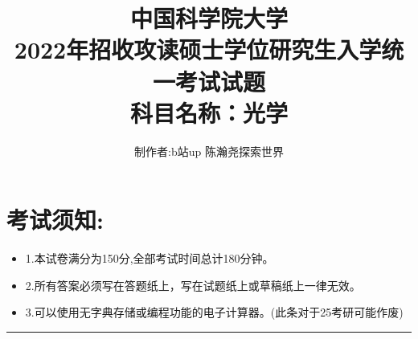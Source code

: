 \documentclass[11pt,a4paper]{article}
\begin{document}
    \title{中国科学院大学\\2022年招收攻读硕士学位研究生入学统一考试试题\\科目名称：光学}
    \author{制作者:b站up 陈瀚尧探索世界}
    \date{}
    \maketitle
    \titleformat{\section}[block]{\normalfont\Large\bfseries}{}{0pt}{}


    \section{考试须知:}
    \begin{itemize}[topsep=0pt,itemsep=0pt,partopsep=0pt]
        \item 1.本试卷满分为150分,全部考试时间总计180分钟。
        \vspace{-3mm}
        \item 2.所有答案必须写在答题纸上，写在试题纸上或草稿纸上一律无效。
        \vspace{-3mm}
        \item 3.可以使用无字典存储或编程功能的电子计算器。(此条对于25考研可能作废)
    \end{itemize}
    \vspace{-5mm}
    \noindent\rule{\textwidth}{0.5pt} %
    \vspace{-12mm}
\end{document}
